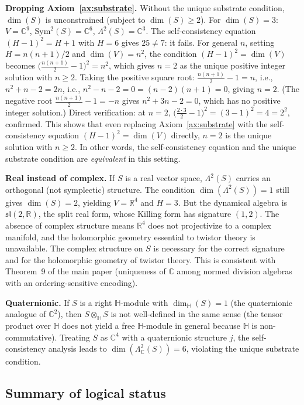 \documentclass[11pt,a4paper]{article}
\theoremstyle{definition}
\theoremstyle{remark}
\newcommand{\C}{\mathbb{C}}
\newcommand{\R}{\mathbb{R}}
\newcommand{\Sym}{\mathrm{Sym}}
\begin{document}
\textbf{Dropping Axiom~\ref{ax:substrate}.}
Without the unique substrate condition, $\dim(S)$ is unconstrained
(subject to $\dim(S)\geq 2$).
For $\dim(S)=3$: $V=\C^9$, $\Sym^2(S)=\C^6$, $\Lambda^2(S)=\C^3$.
The self-consistency equation $(H-1)^2=H+1$ with $H=6$ gives
$25\neq 7$: it fails.
For general $n$, setting $H=n(n+1)/2$ and $\dim(V)=n^2$, the condition
$(H-1)^2=\dim(V)$ becomes
$\bigl(\tfrac{n(n+1)}{2}-1\bigr)^2=n^2$, which gives $n=2$ as the
unique positive integer solution with $n\geq 2$.
Taking the positive square root: $\tfrac{n(n+1)}{2}-1=n$, i.e.,
$n^2+n-2=2n$, i.e., $n^2-n-2=0=(n-2)(n+1)=0$, giving $n=2$.
(The negative root $\tfrac{n(n+1)}{2}-1=-n$ gives $n^2+3n-2=0$, which
has no positive integer solution.)
Direct verification: at $n=2$,
$\bigl(\tfrac{2\cdot 3}{2}-1\bigr)^2=(3-1)^2=4=2^2$, confirmed.
This shows that even replacing Axiom~\ref{ax:substrate} with the
self-consistency equation $(H-1)^2=\dim(V)$ directly, $n=2$ is the
unique solution with $n\geq 2$.
In other words, the self-consistency equation and the unique substrate
condition are \emph{equivalent} in this setting.

\textbf{Real instead of complex.}
If $S$ is a real vector space, $\Lambda^2(S)$ carries an orthogonal
(not symplectic) structure.
The condition $\dim(\Lambda^2(S))=1$ still gives $\dim(S)=2$, yielding
$V=\R^4$ and $H=3$.
But the dynamical algebra is $\mathfrak{sl}(2,\R)$, the split real
form, whose Killing form has signature $(1,2)$.
The absence of complex structure means $\R^4$ does not projectivize to
a complex manifold, and the holomorphic geometry essential to twistor
theory is unavailable.
The complex structure on $S$ is necessary for the correct signature and
for the holomorphic geometry of twistor theory.
This is consistent with Theorem~9 of the main paper (uniqueness of
$\C$ among normed division algebras with an ordering-sensitive
encoding).

\textbf{Quaternionic.}
If $S$ is a right $\mathbb{H}$-module with $\dim_\mathbb{H}(S)=1$
(the quaternionic analogue of $\C^2$), then
$S\otimes_\mathbb{H}S$ is not well-defined in the same sense (the
tensor product over $\mathbb{H}$ does not yield a free
$\mathbb{H}$-module in general because $\mathbb{H}$ is
non-commutative).
Treating $S$ as $\C^4$ with a quaternionic structure $j$, the
self-consistency analysis leads to $\dim(\Lambda^2_\C(S))=6$, violating
the unique substrate condition.

\subsection{Summary of logical status}
\end{document}
